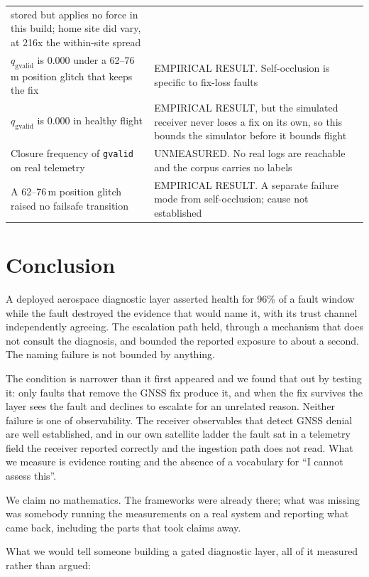 \documentclass[11pt,a4paper]{article}
\newcommand{\code}[1]{\texttt{\small #1}}
\begin{document}
\begin{longtable}{p{}p{}}
stored but applies no force in this build; home site did vary, at 216x the
within-site spread \\
$q_{\mathrm{gvalid}}$ is 0.000 under a 62--76\,m position glitch that keeps the
fix & EMPIRICAL RESULT. Self-occlusion is specific to fix-loss faults \\
$q_{\mathrm{gvalid}}$ is 0.000 in healthy flight & EMPIRICAL RESULT, but the
simulated receiver never loses a fix on its own, so this bounds the simulator
before it bounds flight \\
Closure frequency of \code{gvalid} on real telemetry & UNMEASURED. No real
logs are reachable and the corpus carries no labels \\
A 62--76\,m position glitch raised no failsafe transition & EMPIRICAL RESULT.
A separate failure mode from self-occlusion; cause not established \\
\bottomrule
\end{longtable}

\section{Conclusion}

A deployed aerospace diagnostic layer asserted health for 96\% of a fault
window while the fault destroyed the evidence that would name it, with its
trust channel independently agreeing. The escalation path held, through a
mechanism that does not consult the diagnosis, and bounded the reported
exposure to about a second. The naming failure is not bounded by anything.

The condition is narrower than it first appeared and we found that out by
testing it: only faults that remove the GNSS fix produce it, and when the fix
survives the layer sees the fault and declines to escalate for an unrelated
reason. Neither failure is one of observability. The receiver observables that
detect GNSS denial are well established, and in our own satellite ladder the
fault sat in a telemetry field the receiver reported correctly and the
ingestion path does not read. What we measure is evidence routing and the
absence of a vocabulary for ``I cannot assess this''.

We claim no mathematics. The frameworks were already there; what was missing
was somebody running the measurements on a real system and reporting what came
back, including the parts that took claims away.

What we would tell someone building a gated diagnostic layer, all of it
measured rather than argued:
\end{document}
